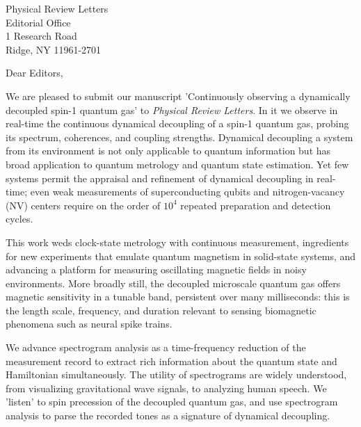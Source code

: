 \documentclass[10pt,letterpaper]{letter} %
\begin{document}

\begin{letter}{
	Physical Review Letters\\
	Editorial Office\\
	1 Research Road \\
	Ridge, NY 11961-2701\\
}


\opening{Dear Editors,}

We are pleased to submit our manuscript 'Continuously observing a dynamically decoupled spin-1 quantum gas' to \textit{Physical Review Letters}.
In it we observe in real-time the continuous dynamical decoupling of a spin-1 quantum gas, probing its spectrum, coherences, and coupling strengths.
Dynamical decoupling a system from its environment is not only applicable to quantum information but has broad application to quantum metrology and quantum state estimation.
Yet few systems permit the appraisal and refinement of dynamical decoupling in real-time; even weak measurements of superconducting qubits and nitrogen-vacancy (NV) centers require on the order of $10^4$ repeated preparation and detection cycles.

This work weds clock-state metrology with continuous measurement, ingredients for new experiments that emulate quantum magnetism in solid-state systems, and advancing a platform for measuring oscillating magnetic fields in noisy environments.
More broadly still, the decoupled microscale quantum gas offers magnetic sensitivity in a tunable band, persistent over many milliseconds: this is the length scale, frequency, and duration relevant to sensing biomagnetic phenomena such as neural spike trains.

We advance spectrogram analysis as a time-frequency reduction of the measurement record to extract rich information about the quantum state and Hamiltonian simultaneously.
The utility of spectrograms are widely understood, from visualizing gravitational wave signals, to analyzing human speech.
We 'listen' to spin precession of the decoupled quantum gas, and use spectrogram analysis to parse the recorded tones as a signature of dynamical decoupling.


\end{letter}
\end{document}
